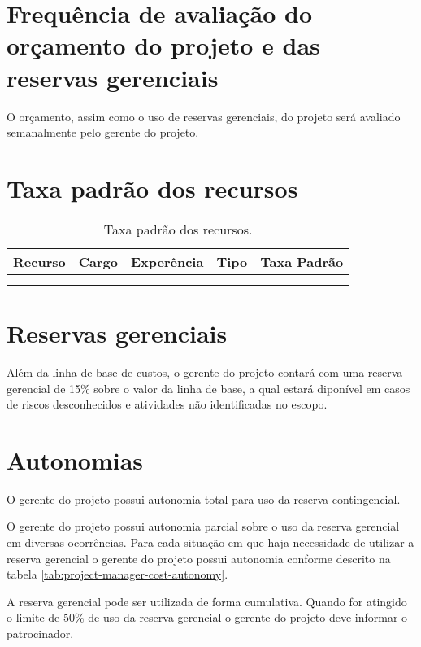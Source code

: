 \section{Frequência de avaliação do orçamento do projeto e das reservas gerenciais}

O orçamento, assim como o uso de reservas gerenciais, do projeto será avaliado semanalmente pelo gerente do projeto.

\section{Taxa padrão dos recursos}

\begin{longtable}{ l l l l l }
	\toprule
	\textbf{Recurso} & \textbf{Cargo} & \textbf{Experência} & \textbf{Tipo} & \textbf{Taxa Padrão} \\
	\midrule
	  &   &   &   &   \\
	\bottomrule
	\caption{Taxa padrão dos recursos.}
	\centering
\end{longtable}

\section{Reservas gerenciais}

Além da linha de base de custos, o gerente do projeto contará com uma reserva gerencial de 15\% sobre o valor da linha de base, a qual estará diponível em casos de riscos desconhecidos e atividades não identificadas no escopo.

\section{Autonomias}

O gerente do projeto possui autonomia total para uso da reserva contingencial.

O gerente do projeto possui autonomia parcial sobre o uso da reserva gerencial em diversas ocorrências. Para cada situação em que haja necessidade de utilizar a reserva gerencial o gerente do projeto possui autonomia conforme descrito na tabela \ref{tab:project-manager-cost-autonomy}.


A reserva gerencial pode ser utilizada de forma cumulativa. Quando for atingido o limite de 50\% de uso da reserva gerencial o gerente do projeto deve informar o patrocinador.

